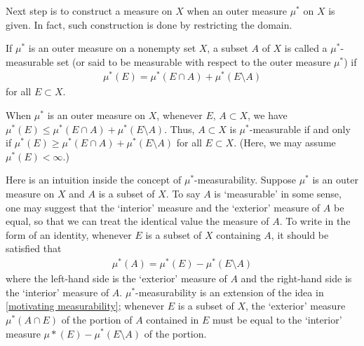 Next step is to construct a measure on $X$ when an outer measure $\mu^*$ on $X$ is given.
In fact, such construction is done by restricting the domain.
\begin{defi}
    If $\mu^*$ is an outer measure on a nonempty set $X$, a subset $A$ of $X$ is called a $\mu^*$-measurable set (or said to be measurable with respect to the outer measure $\mu^*$) if
    \begin{align*}
        \mu^*(E)=\mu^*(E\cap A)+\mu^*(E\setminus A)
    \end{align*}
    for all $E\subset X$.
\end{defi}
\begin{rmk}
    When $\mu^*$ is an outer measure on $X$, whenever $E,\,A\subset X$, we have $\mu^*(E)\leq\mu^*(E\cap A)+\mu^*(E\setminus A)$.
    Thus, $A\subset X$ is $\mu^*$-measurable if and only if $\mu^*(E)\geq\mu^*(E\cap A)+\mu^*(E\setminus A)$ for all $E\subset X$.
    (Here, we may assume $\mu^*(E)<\infty$.)
\end{rmk}

Here is an intuition inside the concept of $\mu^*$-measurability.
Suppose $\mu^*$ is an outer measure on $X$ and $A$ is a subset of $X$.
To say $A$ is `measurable' in some sense, one may suggest that the `interior' measure and the `exterior' measure of $A$ be equal, so that we can treat the identical value the measure of $A$.
To write in the form of an identity, whenever $E$ is a subset of $X$ containing $A$, it should be satisfied that
\begin{align}\label{motivating measurability}
    \mu^*(A)=\mu^*(E)-\mu^*(E\setminus A)
\end{align}
where the left-hand side is the `exterior' measure of $A$ and the right-hand side is the `interior' measure of $A$.
$\mu^*$-measurability is an extension of the idea in \cref{motivating measurability}; whenever $E$ is a subset of $X$, the `exterior' measure $\mu^*(A\cap E)$ of the portion of $A$ contained in $E$ must be equal to the `interior' measure $\mu*(E)-\mu^*(E\setminus A)$ of the portion.

